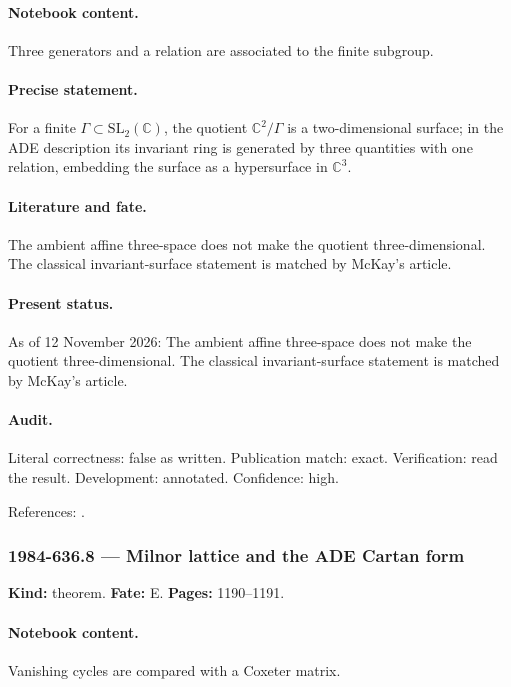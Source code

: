 \paragraph{Notebook content.} Three generators and a relation are associated to the finite subgroup.

\paragraph{Precise statement.} For a finite \(\Gamma\subset\mathrm{SL}_2(\mathbb C)\), the quotient \(\mathbb C^2/\Gamma\) is a two-dimensional surface; in the ADE description its invariant ring is generated by three quantities with one relation, embedding the surface as a hypersurface in \(\mathbb C^3\).

\paragraph{Literature and fate.} The ambient affine three-space does not make the quotient three-dimensional. The classical invariant-surface statement is matched by McKay's article.

\paragraph{Present status.} As of 12 November 2026: The ambient affine three-space does not make the quotient three-dimensional. The classical invariant-surface statement is matched by McKay's article.

\paragraph{Audit.} Literal correctness: false as written. Publication match: exact. Verification: read the result. Development: annotated. Confidence: high.

\noindent References: \citep{mckay1980graphs}.\par

\subsubsection{1984-636.8 --- Milnor lattice and the ADE Cartan form}

\label{item:1984-636.8}

\noindent\textbf{Kind:} theorem. \textbf{Fate:} E. \textbf{Pages:} 1190--1191.\par

\paragraph{Notebook content.} Vanishing cycles are compared with a Coxeter matrix.

